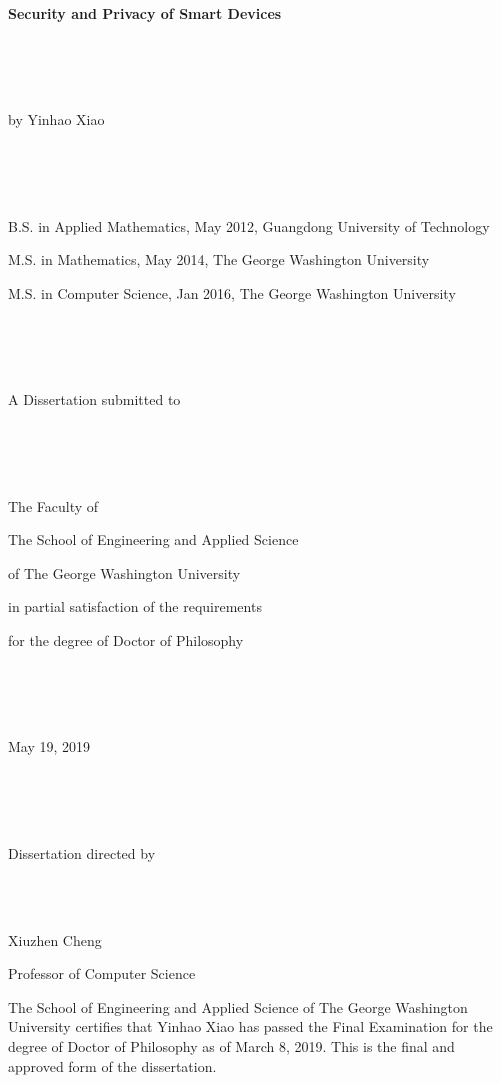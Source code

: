\documentclass[letterpaper,12pt]{article}
\begin{document}
\singlespacing
~\\
~\\
~\\
~\\
~\\
\centerline{\bf{Security and Privacy of Smart Devices}}
~\\
~\\
~\\
\centerline{by Yinhao Xiao}
~\\
~\\
~\\
\centerline{B.S. in Applied Mathematics, May 2012, Guangdong University of Technology}

\centerline{M.S. in Mathematics, May 2014, The George Washington University}

\centerline{M.S. in Computer Science, Jan 2016, The George Washington University}
~\\
~\\
~\\
\centerline{A Dissertation submitted to}
~\\
~\\
~\\
\centerline{The Faculty of}

\centerline{The School of Engineering and Applied Science}

\centerline{of The George Washington University}

\centerline{in partial satisfaction of the requirements}

\centerline{for the degree of Doctor of Philosophy}
~\\
~\\
~\\
\centerline{May 19, 2019}
~\\
~\\
~\\
\centerline{Dissertation directed by}
~\\
~\\
\centerline{Xiuzhen Cheng}
\centerline{Professor of Computer Science}

	
	
   \newpage
   \doublespacing
	\setcounter{page}{2}
\noindent The School of Engineering and Applied Science of The George Washington University
certifies that Yinhao Xiao has passed the Final Examination for the degree of Doctor of
Philosophy as of March 8, 2019. This is the final and approved form of the dissertation.
\end{document}
